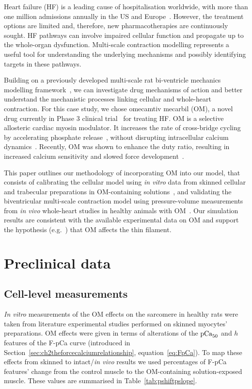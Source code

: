 \vspace{0.2cm}
Heart failure (HF) is a leading cause of hospitalisation worldwide, with more than one million admissions annually in the US and Europe~\cite{Benjamin:2018}. However, the treatment options are limited and, therefore, new pharmacotherapies are continuously sought. HF pathways can involve impaired cellular function and propagate up to the whole-organ dysfunction. Multi-scale contraction modelling represents a useful tool for understanding the underlying mechanisms and possibly identifying targets in these pathways.

Building on a previously developed multi-scale rat bi-ventricle mechanics modelling framework~\cite{Longobardi:2020}, we can investigate drug mechanisms of action and better understand the mechanistic processes linking cellular and whole-heart contraction. For this case study, we chose omecamtiv mecarbil (OM), a novel drug currently in Phase $3$ clinical trial~\cite{Teerlink:2021} for treating HF. OM is a selective allosteric cardiac myosin modulator. It increases the rate of cross-bridge cycling by accelerating phosphate release~\cite{Malik:2011}, without disrupting intracellular calcium dynamics~\cite{Horvath:2017}. Recently, OM was shown to enhance the duty ratio, resulting in increased calcium sensitivity and slowed force development~\cite{Swenson:2017, Kampourakis:2018}.

This paper outlines our methodology of incorporating OM into our model, that consists of calibrating the cellular model using \textit{in vitro} data from skinned cellular and trabecular preparations in OM-containing solutions~\cite{Nagy:2015,Kampourakis:2018,Kieu:2019}, and validating the biventricular multi-scale contraction model using pressure-volume measurements from \textit{in vivo} whole-heart studies in healthy animals with OM~\cite{Bakkehaug:2015}. Our simulation results are consistent with the available experimental data on OM and support the hypothesis (e.g.~\cite{Swenson:2017}) that OM affects the thin filament.


%
%
%
\section{Preclinical data}\label{sec:ch5preclinical_data}


%
%
%
\subsection{Cell-level measurements}\label{sec:ch5celllevelmeasurements}
\textit{In vitro} measurements of the OM effects on the sarcomere in healthy rats were taken from literature experimental studies performed on skinned myocytes' preparations. OM effects were given in terms of alterations of the $\textrm{pCa}_{50}$ and $h$ features of the F-pCa curve (introduced in Section~\ref{sec:ch2theforcecalciumrelationship}, equation~\eqref{eq:FpCa}). To map these effects from skinned to intact/\textit{in vivo} results we used percentages of F-pCa features' change from the control muscle to the OM-containing solution-exposed muscle. These values are summarised in Table~\ref{tab:pshiftpslope}.

